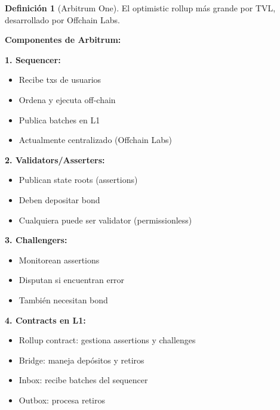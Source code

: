 \documentclass[11pt,a4paper,twoside,openright]{book}
\theoremstyle{definition}
\newtheorem{definition}{Definición}[chapter]
\theoremstyle{plain}
\theoremstyle{remark}
\begin{document}
\begin{definition}[Arbitrum One]
El optimistic rollup más grande por TVL, desarrollado por Offchain Labs.
\end{definition}

\begin{keyidea}
\textbf{Componentes de Arbitrum:}

\textbf{1. Sequencer:}
\begin{itemize}
    \item Recibe txs de usuarios
    \item Ordena y ejecuta off-chain
    \item Publica batches en L1
    \item Actualmente centralizado (Offchain Labs)
\end{itemize}

\textbf{2. Validators/Asserters:}
\begin{itemize}
    \item Publican state roots (assertions)
    \item Deben depositar bond
    \item Cualquiera puede ser validator (permissionless)
\end{itemize}

\textbf{3. Challengers:}
\begin{itemize}
    \item Monitorean assertions
    \item Disputan si encuentran error
    \item También necesitan bond
\end{itemize}

\textbf{4. Contracts en L1:}
\begin{itemize}
    \item Rollup contract: gestiona assertions y challenges
    \item Bridge: maneja depósitos y retiros
    \item Inbox: recibe batches del sequencer
    \item Outbox: procesa retiros
\end{itemize}
\end{keyidea}
\end{document}
